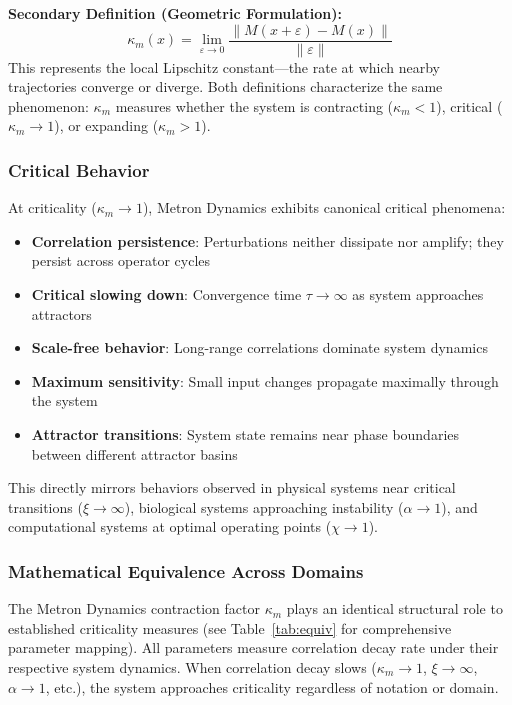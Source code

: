 \documentclass[11pt]{article}
\begin{document}
\textbf{Secondary Definition (Geometric Formulation):}
\begin{equation}
\kappa_m(x) = \lim_{\varepsilon \to 0} \frac{\|M(x+\varepsilon) - M(x)\|}{\|\varepsilon\|}
\end{equation}
This represents the local Lipschitz constant---the rate at which nearby trajectories converge or diverge. Both definitions characterize the same phenomenon: $\kappa_m$ measures whether the system is contracting ($\kappa_m < 1$), critical ($\kappa_m \to 1$), or expanding ($\kappa_m > 1$).

\subsubsection{Critical Behavior}

At criticality ($\kappa_m \to 1$), Metron Dynamics exhibits canonical critical phenomena:
\begin{itemize}[nosep]
    \item \textbf{Correlation persistence}: Perturbations neither dissipate nor amplify; they persist across operator cycles
    \item \textbf{Critical slowing down}: Convergence time $\tau \to \infty$ as system approaches attractors
    \item \textbf{Scale-free behavior}: Long-range correlations dominate system dynamics
    \item \textbf{Maximum sensitivity}: Small input changes propagate maximally through the system
    \item \textbf{Attractor transitions}: System state remains near phase boundaries between different attractor basins
\end{itemize}
This directly mirrors behaviors observed in physical systems near critical transitions ($\xi \to \infty$), biological systems approaching instability ($\alpha \to 1$), and computational systems at optimal operating points ($\chi \to 1$).

\subsubsection{Mathematical Equivalence Across Domains}

The Metron Dynamics contraction factor $\kappa_m$ plays an identical structural role to established criticality measures (see Table~\ref{tab:equiv} for comprehensive parameter mapping). All parameters measure correlation decay rate under their respective system dynamics. When correlation decay slows ($\kappa_m \to 1$, $\xi \to \infty$, $\alpha \to 1$, etc.), the system approaches criticality regardless of notation or domain.
\end{document}
